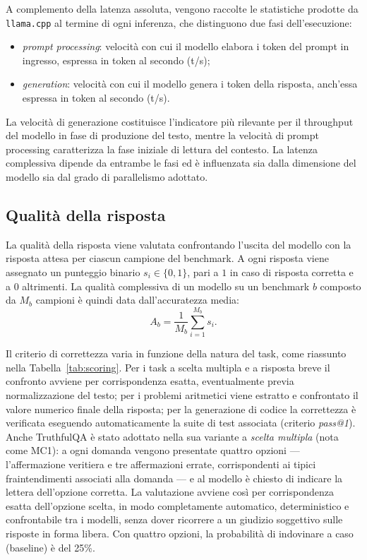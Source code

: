 A complemento della latenza assoluta, vengono raccolte le statistiche prodotte da
\texttt{llama.cpp} al termine di ogni inferenza, che distinguono due fasi
dell'esecuzione:
\begin{itemize}
    \item \textit{prompt processing}: velocità con cui il modello elabora i token
    del prompt in ingresso, espressa in token al secondo (t/s);
    \item \textit{generation}: velocità con cui il modello genera i token della
    risposta, anch'essa espressa in token al secondo (t/s).
\end{itemize}

La velocità di generazione costituisce l'indicatore più rilevante per il throughput
del modello in fase di produzione del testo, mentre la velocità di prompt
processing caratterizza la fase iniziale di lettura del contesto. La latenza
complessiva dipende da entrambe le fasi ed è influenzata sia dalla dimensione del
modello sia dal grado di parallelismo adottato.

\subsection{Qualità della risposta}

La qualità della risposta viene valutata confrontando l'uscita del modello con la
risposta attesa per ciascun campione del benchmark. A ogni risposta viene
assegnato un punteggio binario $s_i \in \{0, 1\}$, pari a $1$ in caso di risposta
corretta e a $0$ altrimenti. La qualità complessiva di un modello su un benchmark
$b$ composto da $M_b$ campioni è quindi data dall'accuratezza media:
\begin{equation}
    A_b = \frac{1}{M_b} \sum_{i=1}^{M_b} s_i .
    \label{eq:accuratezza}
\end{equation}

Il criterio di correttezza varia in funzione della natura del task, come riassunto
nella Tabella~\ref{tab:scoring}. Per i task a scelta multipla e a risposta breve
il confronto avviene per corrispondenza esatta, eventualmente previa
normalizzazione del testo; per i problemi aritmetici viene estratto e confrontato
il valore numerico finale della risposta; per la generazione di codice la
correttezza è verificata eseguendo automaticamente la suite di test associata
(criterio \textit{pass@1}). Anche TruthfulQA è stato adottato nella sua variante a
\textit{scelta multipla} (nota come MC1): a ogni domanda vengono presentate quattro
opzioni --- l'affermazione veritiera e tre affermazioni errate, corrispondenti ai tipici
fraintendimenti associati alla domanda --- e al modello è chiesto di indicare la lettera
dell'opzione corretta. La valutazione avviene così per corrispondenza esatta dell'opzione
scelta, in modo completamente automatico, deterministico e confrontabile tra i modelli,
senza dover ricorrere a un giudizio soggettivo sulle risposte in forma libera. Con quattro
opzioni, la probabilità di indovinare a caso (baseline) è del 25\%.

